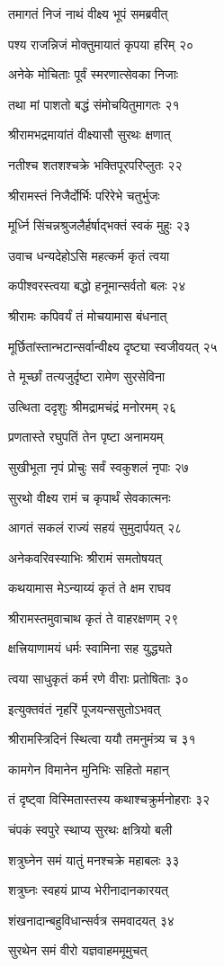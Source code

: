तमागतं निजं नाथं वीक्ष्य भूपं समब्रवीत्

पश्य राजन्निजं मोक्तुमायातं कृपया हरिम् २०

अनेके मोचिताः पूर्वं स्मरणात्सेवका निजाः

तथा मां पाशतो बद्धं संमोचयितुमागतः २१

श्रीरामभद्रमायांतं वीक्ष्यासौ सुरथः क्षणात्

नतीश्च शतशश्चक्रे भक्तिपूरपरिप्लुतः २२

श्रीरामस्तं निजैर्दोर्भिः परिरेभे चतुर्भुजः

मूर्ध्नि सिंचन्नश्रुजलैर्हर्षाद्भक्तं स्वकं मुहुः २३

उवाच धन्यदेहोऽसि महत्कर्म कृतं त्वया

कपीश्वरस्त्वया बद्धो हनूमान्सर्वतो बलः २४

श्रीरामः कपिवर्यं तं मोचयामास बंधनात्

मूर्छितांस्तान्भटान्सर्वान्वीक्ष्य दृष्ट्या स्वजीवयत् २५

ते मूर्च्छां तत्यजुर्दृष्टा रामेण सुरसेविना

उत्थिता ददृशुः श्रीमद्रामचंद्रं मनोरमम् २६

प्रणतास्ते रघुपतिं तेन पृष्टा अनामयम्

सुखीभूता नृपं प्रोचुः सर्वं स्वकुशलं नृपाः २७

सुरथो वीक्ष्य रामं च कृपार्थं सेवकात्मनः

आगतं सकलं राज्यं सहयं सुमुदार्पयत् २८

अनेकवरिवस्याभिः श्रीरामं समतोषयत्

कथयामास मेऽन्याय्यं कृतं ते क्षम राघव

श्रीरामस्तमुवाचाथ कृतं ते वाहरक्षणम् २९

क्षत्त्रियाणामयं धर्मः स्वामिना सह युद्ध्यते

त्वया साधुकृतं कर्म रणे वीराः प्रतोषिताः ३०

इत्युक्तवंतं नृहरिं पूजयन्ससुतोऽभवत्

श्रीरामस्त्रिदिनं स्थित्वा ययौ तमनुमंत्र्य च ३१

कामगेन विमानेन मुनिभिः सहितो महान्

तं दृष्ट्वा विस्मितास्तस्य कथाश्चक्रुर्मनोहराः ३२

चंपकं स्वपुरे स्थाप्य सुरथः क्षत्रियो बली

शत्रुघ्नेन समं यातुं मनश्चक्रे महाबलः ३३

शत्रुघ्नः स्वहयं प्राप्य भेरीनादानकारयत्

शंखनादान्बहुविधान्सर्वत्र समवादयत् ३४

सुरथेन समं वीरो यज्ञवाहममूमुचत्

